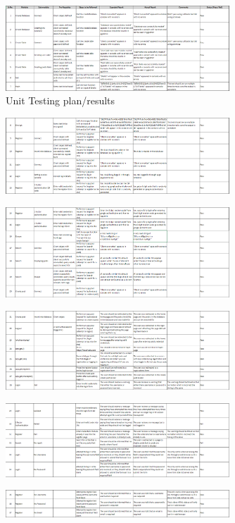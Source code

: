 \documentclass{cmpstyle}
\begin{document}
\begin{figure}[htb]
	\centering
	\caption{Unit Testing plan/results \label{Testing}}
	\includegraphics[width=0.75\textwidth]{Testing1.png}
\end{figure}
\begin{figure}[htb]
	\centering
	\includegraphics[width=0.75\textwidth]{Testing2.png}
\end{figure}
\begin{figure}[htb]
	\centering
	\includegraphics[width=0.75\textwidth]{Testing3.png}
\end{figure}
\begin{figure}[htb]
	\centering
	\includegraphics[width=0.75\textwidth]{Testing4.png}
\end{figure}
\begin{figure}[htb]
	\centering
	\includegraphics[width=0.75\textwidth]{Testing5.png}
\end{figure}
\begin{figure}[htb]
	\centering
	\includegraphics[width=0.75\textwidth]{Testing6.png}
\end{figure}
\clearpage

\end{document}
